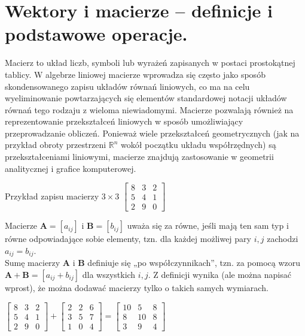 \documentclass[a4paper,12pt,oneside]{book}
\begin{document}
		\setcounter{section}{0}
		\section{Wektory i macierze – definicje i podstawowe operacje.}
				
			Macierz to układ liczb, symboli lub wyrażeń zapisanych w postaci prostokątnej tablicy. W algebrze liniowej macierze wprowadza się często jako sposób skondensowanego zapisu układów równań liniowych, co ma na celu wyeliminowanie powtarzających się elementów standardowej notacji układów równań tego rodzaju z wieloma niewiadomymi. Macierze pozwalają również na reprezentowanie przekształceń liniowych w sposób umożliwiający przeprowadzanie obliczeń. Ponieważ wiele przekształceń geometrycznych (jak na przykład obroty przestrzeni $\mathbb {R} ^{n}$ wokół początku układu współrzędnych) są przekształceniami liniowymi, macierze znajdują zastosowanie w geometrii analitycznej i grafice komputerowej.
			
			Przykład zapisu macierzy $3\times 3$
			$ \begin{bmatrix}
				8 & 3 & 2 \\
				5 & 4 & 1 \\
				2 & 9 & 0 
			\end{bmatrix}  $
			
			Macierze ${\displaystyle \mathbf {A} =[a_{ij}]}$ i ${\displaystyle \mathbf {B} =[b_{ij}]}$ uważa się za równe, jeśli mają ten sam typ i równe odpowiadające sobie elementy, tzn. dla każdej możliwej pary $i,j$ zachodzi ${\displaystyle a_{ij}=b_{ij}.}$\\
			
			Sumę macierzy $\mathbf{A}$ i $\mathbf{B}$ definiuje się „po współczynnikach”, tzn. za pomocą wzoru $\mathbf {A+B} =[a_{ij}+b_{ij}]$ dla wszystkich $i,j.$ Z definicji wynika (ale można napisać wprost), że można dodawać macierzy tylko o takich samych wymiarach.
			
			\begin{center}
				$ \begin{bmatrix}
					8 & 3 & 2 \\
					5 & 4 & 1 \\
					2 & 9 & 0 
				\end{bmatrix} + 
			\begin{bmatrix}
				2 & 2 & 6 \\
				3 & 5 & 7 \\
				1 & 0 & 4 
			\end{bmatrix} = 
		\begin{bmatrix}
			10 & 5 & 8 \\
			8 & 10 & 8 \\
			3 & 9 & 4 
		\end{bmatrix}$
			\end{center}
			
\end{document}
